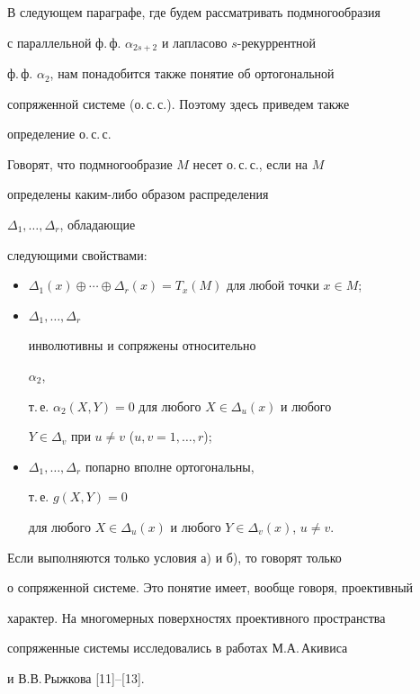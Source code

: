 В следующем параграфе, где будем рассматривать подмногообразия


с параллельной ф.\,ф. $\alpha_{2s+2}$ и лапласово $s$-рекуррентной


ф.\,ф. $\alpha_2$, нам понадобится также понятие об ортогональной


сопряженной системе (о.\,с.\,с.). Поэтому здесь приведем также


определение о.\,с.\,с.





Говорят, что подмногообразие $M$ несет о.\,с.\,с., если на $M$


определены каким-либо образом распределения


$\Delta_1,\dotsc,\Delta_r$, обладающие


следующими свойствами:


\begin{itemize}


\item[а)] $\Delta_1(x)\oplus\dotsb\oplus\Delta_r(x)=


T_x(M)$ для любой точки $x\in M$;


\item[б)] $\Delta_1,\dotsc,\Delta_r$


инволютивны и сопряжены относительно


$\alpha_2$,


т.\,е. $\alpha_2(X,Y)=0$ для любого $X\in\Delta_u(x)$ и любого


$Y\in\Delta_v$ при $u\ne v$ ($u,v=1,\dotsc,r$);


\item[в)] $\Delta_1,\dotsc,\Delta_r$ попарно вполне ортогональны,


т.\,е. $g(X,Y)=0$


для любого $X\in \Delta_u(x)$ и любого $Y\in\Delta_v(x)$, $u\ne v$.


\end{itemize}





Если выполняются только условия а) и б), то говорят только


о сопряженной системе. Это понятие имеет, вообще говоря, проективный


характер. На многомерных поверхностях проективного пространства


сопряженные системы исследовались в работах М.А.\,Акивиса


и В.В.\,Рыжкова [11]--[13].





